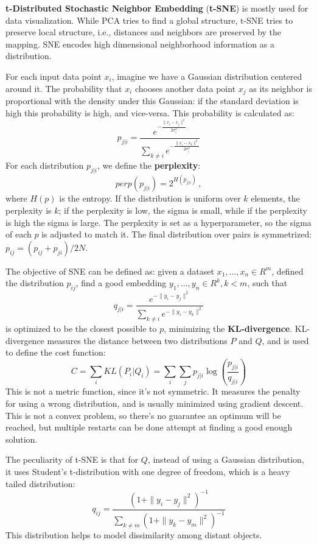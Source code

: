 \textbf{t-Distributed Stochastic Neighbor Embedding} (\textbf{t-SNE}) is mostly used for data visualization. While PCA tries to find a global structure, t-SNE tries to preserve local structure, i.e., distances and neighbors are preserved by the mapping. SNE encodes high dimensional neighborhood information as a distribution.

For each input data point $x_i$, imagine we have a Gaussian distribution centered around it. The probability that $x_i$ chooses another data point $x_j$ as its neighbor is proportional with the density under this Gaussian: if the standard deviation is high this probability is high, and vice-versa. This probability is calculated as:
\begin{equation*}
    p_{j|i} = \dfrac{e^{-\frac{\|x_i - x_j\|^2}{2 \sigma_i^2}}}{\sum_{k \neq i} e^{-\frac{\|x_i - x_k\|^2}{2 \sigma_i^2}}}
\end{equation*}
For each distribution $p_{j|i}$, we define the \textbf{perplexity}:
\begin{equation*}
    \textit{perp}(p_{j|i}) = 2^{H(p_{j|i})} \,,
\end{equation*}
where $H(p)$ is the entropy. If the distribution is uniform over $k$ elements, the perplexity is $k$; if the perplexity is low, the sigma is small, while if the perplexity is high the sigma is large. The perplexity is set as a hyperparameter, so the sigma of each $p$ is adjusted to match it. The final distribution over pairs is symmetrized: $p_{ij} = (p_{ij} + p_{ji}) / 2N$. 

The objective of SNE can be defined as: given a dataset $x_1, \dots, x_n \in R^m$, defined the distribution $p_{ij}$, find a good embedding $y_1, \dots, y_n \in R^k, k < m$, such that
\begin{equation*}
    q_{j|i} = \dfrac{e^{-\|y_i - y_j\|^2}}{\sum_{k \neq i} e^{-\|y_i - y_k\|^2}}
\end{equation*}
is optimized to be the closest possible to $p$, minimizing the \textbf{KL-divergence}. KL-divergence measures the distance between two distributions $P$ and $Q$, and is used to define the cost function:
\begin{equation*}
    C = \sum_i KL(P_i | Q_i) = \sum_i \sum_j p_{j|i} \log(\frac{p_{j|i}}{q_{j|i}})
\end{equation*}
This is not a metric function, since it's not symmetric. It measures the penalty for using a wrong distribution, and is usually minimized using gradient descent. This is not a convex problem, so there's no guarantee an optimum will be reached, but multiple restarts can be done attempt at finding a good enough solution.

The peculiarity of t-SNE is that for $Q$, instead of using a Gaussian distribution, it uses Student's t-distribution with one degree of freedom, which is a heavy tailed distribution:
\begin{equation*}
    q_{ij} = \dfrac{(1 + \|y_i - y_j\|^2)^{-1}}{\sum_{k \neq m} (1 + \|y_k - y_m\|^2)^{-1}}
\end{equation*}
This distribution helps to model dissimilarity among distant objects.
